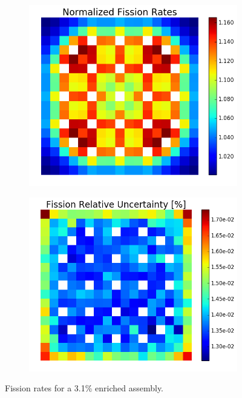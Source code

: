 \begin{figure}[h!]
\centering
\begin{subfigure}{0.44\textwidth}
  \centering
  \includegraphics[width=\linewidth]{figures/benchmarks/fission-rates/fiss-mean-assm-31}
  \caption{}
  \label{fig:chap7-fiss-rate-mean-3.1-assm}
\end{subfigure}%
\begin{subfigure}{0.44\textwidth}
  \centering
  \includegraphics[width=\linewidth]{figures/benchmarks/fission-rates/fiss-rel-err-assm-31}
  \caption{}
  \label{fig:chap7-fiss-rate-rel-err-3.1-assm}
\end{subfigure}%
\caption[Fission rates for a 3.1\% enriched assembly]{Fission rates for a 3.1\% enriched assembly.}
\label{fig:chap7-fiss-rates-3.1-assm}
\end{figure}

